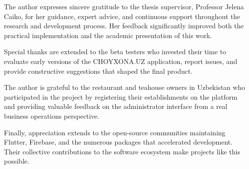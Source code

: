 \frontmatterpage
{}

The author expresses sincere gratitude to the thesis supervisor, Professor Jelena Caiko, for her guidance, expert advice, and continuous support throughout the research and development process.
Her feedback significantly improved both the practical implementation and the academic presentation of this work.

Special thanks are extended to the beta testers who invested their time to evaluate early versions of the CHOYXONA.UZ application, report issues, and provide constructive suggestions that shaped the final product.

The author is grateful to the restaurant and teahouse owners in Uzbekistan who participated in the project by registering their establishments on the platform and providing valuable feedback on the administrator interface from a real business operations perspective.

Finally, appreciation extends to the open-source communities maintaining Flutter, Firebase, and the numerous packages that accelerated development.
Their collective contributions to the software ecosystem make projects like this possible.